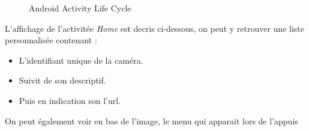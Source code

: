 \begin{center}
\begin{figure}
  \label{activityLifeCycle}
  \centering
  \caption{Android Activity Life Cycle\protect\footnotemark}
  \end{figure}
  \end{center}
\newpage
 L'affichage de l'activitée \textit{Home} est decris ci-dessous, on peut y
 retrouver une liste personnalisée contenant :
 \begin{itemize}
   \item L'identifiant unique de la caméra.
   \item Suivit de son descriptif.
   \item Puis en indication son l'url.
 \end{itemize}
 On peut également voir en bas de l'image, le menu qui apparait lors de l'appuis
